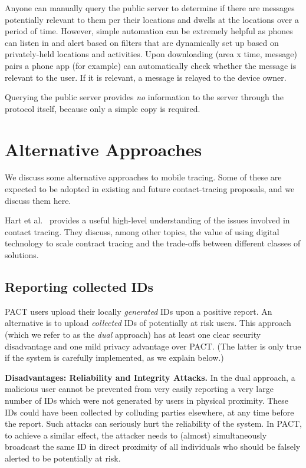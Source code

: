 \documentclass{article}
\begin{document}
Anyone can manually query the public server to determine if there are messages potentially relevant to them per their locations and dwells at the locations over a period of time. However, simple automation can be extremely helpful as phones can listen in and alert based on filters that are dynamically set up based on privately-held locations and activities. Upon downloading (area x time, message) pairs a phone app (for example) can automatically check whether the message is relevant to the user.  If it is relevant, a message is relayed to the device owner.

Querying the public server provides \emph{no} information to the server through the protocol itself, because only a simple copy is required.  


\section{Alternative Approaches}\label{sec:alt}

We discuss some alternative approaches to mobile tracing. Some of these are expected to be adopted in existing and future contact-tracing proposals, and we discuss them here. 

Hart et al.~\cite{vihart} provides a useful high-level understanding of the issues involved in contact tracing. They discuss, among other topics, the value of using digital technology to scale contract tracing and the trade-offs between different classes of solutions.

\subsection{Reporting collected IDs}
\label{sec:dual}

PACT users upload their locally {\em generated} IDs upon a positive report. An alternative is to upload {\em collected} IDs of potentially at risk users. This approach (which we refer to as the {\em dual} approach) has at least one clear security disadvantage and one mild privacy advantage over PACT. (The latter is only true if the system is carefully implemented, as we explain below.)

{\bf Disadvantages: Reliability and Integrity Attacks.} In the dual approach, a malicious user cannot be prevented from very easily reporting a very large number of IDs which were not generated by users in physical proximity. These IDs could have been collected by colluding parties elsewhere, at any time before the report. Such attacks can seriously hurt the reliability of the system. In PACT, to achieve a similar effect, the attacker needs to (almost) simultaneously broadcast the same ID in direct proximity of all individuals who should be falsely alerted to be potentially at risk. 
\end{document}
